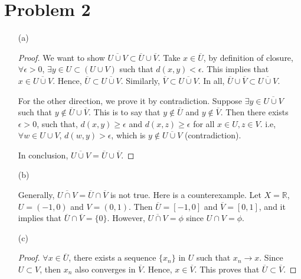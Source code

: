\documentclass[12pt]{article}
\begin{document}
\section*{Problem 2}

\begin{enumerate}
\item [(a)]

\begin{proof}

We want to show $\overline{U\cup V} \subset \overline U \cup \overline V$. Take $x \in \overline U$, by definition of closure, $\forall \epsilon >0$, $\exists y \in U\subset (U\cup V)$ such that  $d(x, y) < \epsilon$. This implies that $x \in \overline{U\cup V}$. Hence, $\overline U \subset \overline{U\cup V}$. Similarly, $\overline V \subset \overline{U\cup V}$. In all, $\overline U \cup \overline V \subset \overline{U\cup V}$.

For the other direction, we prove it by contradiction. Suppose $\exists y \in \overline{U \cup V}$ such that $y \notin \overline U \cup \overline V$. This is to say that $y\notin \overline U$ and $y \notin \overline V$. Then there exists $\epsilon > 0$, such that, $d(x, y) \geqslant \epsilon$ and $d(x, z) \geqslant \epsilon$ for all $x\in U, z \in V$. i.e, $\forall w \in U\cup V$, $d(w, y) > \epsilon$, which is $y\notin \overline{U \cup V}$ (contradiction).

In conclusion, $\overline{U\cup V} = \overline U \cup \overline V$.

\end{proof}


\item [(b)]

Generally, $\overline{U\cap V} = \overline U \cap \overline V$ is not true. Here is a counterexample. Let $X = \mathbb R$, $U = (-1, 0)$ and $V = (0, 1)$. Then $\overline U = [-1, 0]$ and $\overline V = [0, 1]$, and it implies that $\overline U \cap \overline V = \{ 0 \} $. However, $\overline {U\cap V} = \phi$ since $U\cap V = \phi$.

\item [(c)]

\begin{proof}

$\forall x \in \overline U$, there exists a sequence $\{x_n\}$ in $U$ such that $x_n \rightarrow x$. Since $U \subset V$, then $x_n$ also converges in $\overline V$. Hence, $x \in \overline V$. This proves that $\overline U \subset \overline V$.

\end{proof}

\end{enumerate}
\end{document}
